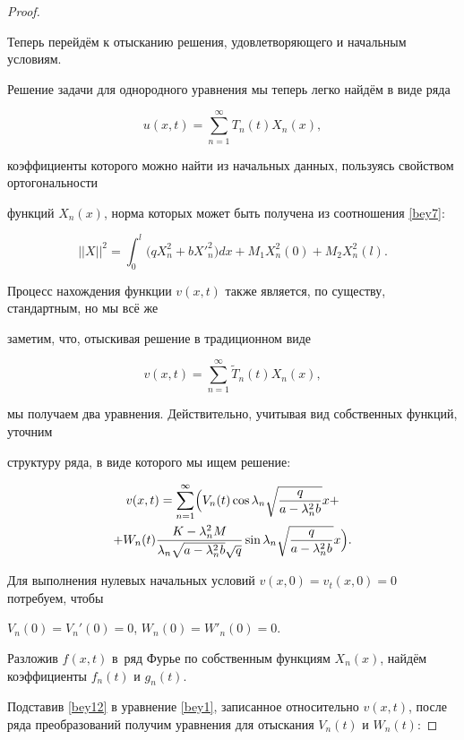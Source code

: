\begin{proof}
\begin{equation}
\end{equation}



Теперь перейдём к отысканию решения, удовлетворяющего и начальным условиям.

Решение задачи для однородного уравнения мы теперь легко найдём в виде ряда

$$u(x,t)=\sum\limits_{n=1}^{\infty}T_n(t)X_n(x),$$

коэффициенты которого можно найти из начальных данных, пользуясь свойством ортогональности

функций $X_n(x)$, норма которых может быть получена из соотношения \eqref{bey7}:

$$

||X||^2=\int_0^l \bigl(qX^2_n+bX'^2_n \bigr)dx + M_1X^2_n(0)+M_2X^2_n(l).$$

Процесс нахождения функции $v(x,t)$ также является, по существу, стан\-дарт\-ным, но мы всё же

заметим, что, отыскивая решение в традиционном виде

$$v(x,t)= \sum\limits_{n=1}^{\infty}\tilde{T}_n(t)X_n(x),$$

мы получаем два уравнения. Действительно, учитывая вид собственных функций, уточним

структуру ряда, в виде которого мы ищем решение:

\begin{multline}

 \label{bey12}

v(x,t)= \sum\limits_{n=1}^{\infty}\Bigl(

V_n(t)

\cos \lambda_n \sqrt{\frac{q}{a-\lambda_n^2b}}x +

\\

+W_n(t)\frac{K-\lambda_n^2M}{\lambda_n

\sqrt{a-\lambda^2_nb}\sqrt{q}}\sin \lambda_n \sqrt{\frac{q}{a-\lambda_n^2b}}x\Bigr).

\end{multline}

 Для выполнения нулевых начальных условий $v(x, 0)=v_t(x, 0)=0$ потребуем, чтобы

$V_n(0)=V_n'(0)=0$, $W_n(0)=W'_n(0)=0$.

Разложив $f(x,t)$ в~ряд Фурье по собственным функциям $X_n(x)$, найдём коэффициенты $f_n(t)$ и $g_n(t)$. 

Подставив \eqref{bey12} в уравнение \eqref{bey1}, записанное относительно $v(x,t)$, после ряда преобразований получим уравнения для отыскания $V_n(t)$ и $W_n(t)$:


\end{proof}
